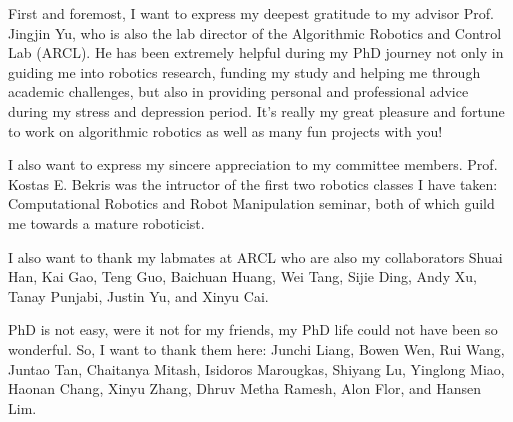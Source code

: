 
\begin{acknowledgments}
First and foremost, I want to express my deepest gratitude to my advisor Prof. Jingjin Yu, 
who is also the lab director of the Algorithmic Robotics and Control Lab (ARCL). 
He has been extremely helpful during my PhD journey 
not only in guiding me into robotics research, funding my study and helping me through academic challenges,
but also in providing personal and professional advice during my stress and depression period. 
It's really my great pleasure and fortune to work on algorithmic robotics 
as well as many fun projects with you! 

I also want to express my sincere appreciation to my committee members. 
Prof. Kostas E. Bekris was the intructor of the first two robotics classes I have taken: 
Computational Robotics and Robot Manipulation seminar, both of which guild me 
towards a mature roboticist. 

I also want to thank my labmates at ARCL who are also my collaborators Shuai Han, 
Kai Gao, Teng Guo, Baichuan Huang, Wei Tang, Sijie Ding, Andy Xu, Tanay Punjabi, 
Justin Yu, and Xinyu Cai.

PhD is not easy, were it not for my friends, my PhD life
could not have been so wonderful. 
So, I want to thank them here: Junchi Liang, Bowen Wen, Rui Wang, Juntao Tan, Chaitanya Mitash, 
Isidoros Marougkas, Shiyang Lu, Yinglong Miao, Haonan Chang, Xinyu Zhang, 
Dhruv Metha Ramesh, Alon Flor, and Hansen Lim. 

\end{acknowledgments}

